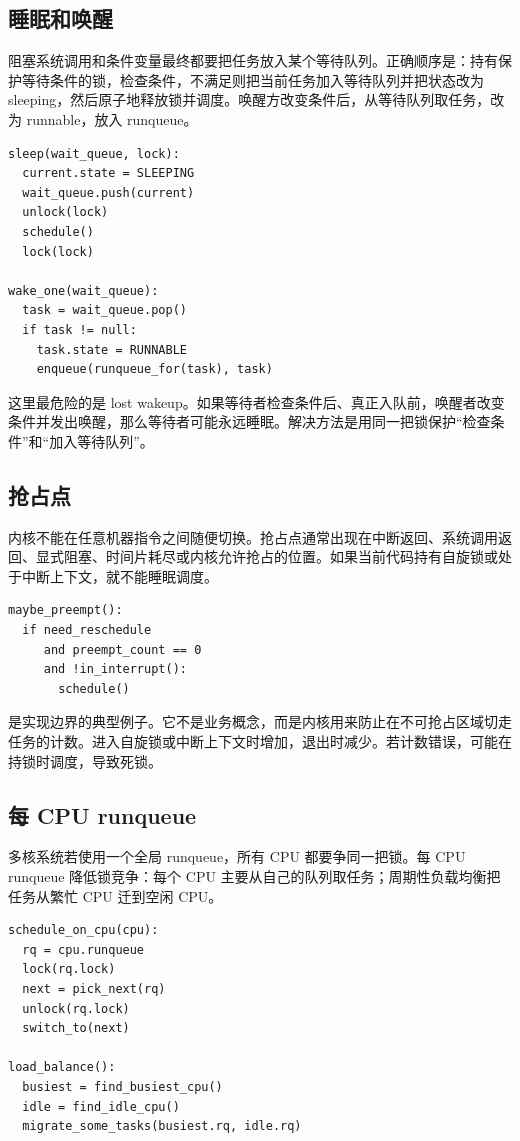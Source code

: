\subsection{睡眠和唤醒}

阻塞系统调用和条件变量最终都要把任务放入某个等待队列。正确顺序是：持有保护等待条件的锁，检查条件，不满足则把当前任务加入等待队列并把状态改为 sleeping，然后原子地释放锁并调度。唤醒方改变条件后，从等待队列取任务，改为 runnable，放入 runqueue。

\begin{lstlisting}
sleep(wait_queue, lock):
  current.state = SLEEPING
  wait_queue.push(current)
  unlock(lock)
  schedule()
  lock(lock)

wake_one(wait_queue):
  task = wait_queue.pop()
  if task != null:
    task.state = RUNNABLE
    enqueue(runqueue_for(task), task)
\end{lstlisting}

这里最危险的是 lost wakeup。如果等待者检查条件后、真正入队前，唤醒者改变条件并发出唤醒，那么等待者可能永远睡眠。解决方法是用同一把锁保护“检查条件”和“加入等待队列”。

\subsection{抢占点}

内核不能在任意机器指令之间随便切换。抢占点通常出现在中断返回、系统调用返回、显式阻塞、时间片耗尽或内核允许抢占的位置。如果当前代码持有自旋锁或处于中断上下文，就不能睡眠调度。

\begin{lstlisting}
maybe_preempt():
  if need_reschedule
     and preempt_count == 0
     and !in_interrupt():
       schedule()
\end{lstlisting}

 是实现边界的典型例子。它不是业务概念，而是内核用来防止在不可抢占区域切走任务的计数。进入自旋锁或中断上下文时增加，退出时减少。若计数错误，可能在持锁时调度，导致死锁。

\subsection{每 CPU runqueue}

多核系统若使用一个全局 runqueue，所有 CPU 都要争同一把锁。每 CPU runqueue 降低锁竞争：每个 CPU 主要从自己的队列取任务；周期性负载均衡把任务从繁忙 CPU 迁到空闲 CPU。

\begin{lstlisting}
schedule_on_cpu(cpu):
  rq = cpu.runqueue
  lock(rq.lock)
  next = pick_next(rq)
  unlock(rq.lock)
  switch_to(next)

load_balance():
  busiest = find_busiest_cpu()
  idle = find_idle_cpu()
  migrate_some_tasks(busiest.rq, idle.rq)
\end{lstlisting}

